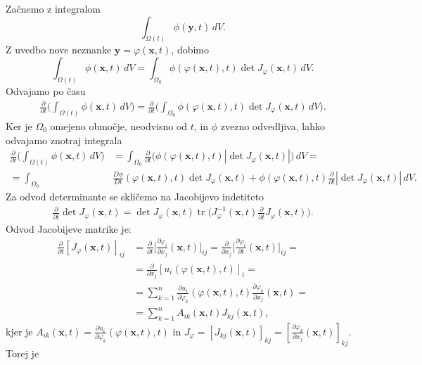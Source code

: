 \documentclass[mat2, tisk]{fmfdelo}
\newcommand{\bd}{\textbf}
\begin{document}
\begin{dokaz}
Začnemo z integralom 
$$
\int_{\Omega(t)} \phi(\mathbf{y},t)\, dV.
$$
Z uvedbo nove neznanke $\bd{y} = \varphi(\bd{x}, t)$, dobimo 
$$
\int_{\Omega(t)} \phi(\mathbf{x},t)\, dV = \int_{\Omega_0} \phi(\varphi({\mathbf{x}},t), t) \det{J_\varphi(\bd{x}, t)} \, dV.
$$
Odvajamo po času 
\begin{align*}
\frac{\partial}{\partial t} \Big(\int_{\Omega(t)} \phi(\mathbf{x},t)\, dV\Big) = \frac{\partial}{\partial t} \Big(\int_{\Omega_0} \phi(\varphi({\mathbf{x}},t), t) \det{J_\varphi(\bd{x}, t)} \, dV \Big).
\end{align*}
Ker je $\Omega_0$ omejeno območje, neodvisno od $t$, in $\phi$ zvezno odvedljiva, lahko odvajamo
znotraj integrala
\begin{align*}
\frac{\partial}{\partial t} \Big(\int_{\Omega(t)} \phi(\mathbf{x},t)\, dV\Big) &= \int_{\Omega_0} \frac{\partial}{\partial t} \Big(\phi(\varphi({\mathbf{x}},t), t) |\det{J_\varphi(\bd{x}, t)}|\Big) \, dV = \\
= \int_{\Omega_0} &\frac{D \phi}{D t}(\varphi(\bd{x}, t), t) \det J_\varphi(\bd{x}, t) + \phi(\varphi({\mathbf{x}},t), t) \frac{\partial}{\partial t} |\det{J_\varphi(\bd{x}, t)}| \, dV.
\end{align*}
Za odvod determinante se skličemo na Jacobijevo indetiteto 
\begin{align*}
\frac{\partial}{\partial t} \det{J_\varphi(\bd{x}, t)} = \det{J_\varphi(\bd{x}, t)} \operatorname{tr}\Big(J_\varphi^{-1}(\bd{x}, t) \frac{\partial}{\partial t} J_\varphi(\bd{x}, t)\Big).
\end{align*}
Odvod Jacobijeve matrike je:
\begin{align*}
\frac{\partial}{\partial t} [J_\varphi(\bd{x}, t)]_{ij} &= \frac{\partial}{\partial t} \Big[\frac{\partial \varphi_i}{\partial x_j}(\bd{x}, t)\Big]_{ij} = \frac{\partial}{\partial x_j} \Big[\frac{\partial \varphi_i}{\partial t}(\bd{x}, t)\Big]_{ij} = \\
&= \frac{\partial}{\partial x_j} [u_i(\varphi(\bd{x}, t), t)]_i = \\
&= \sum_{k=1}^n \frac{\partial u_i}{\partial \varphi_k}(\varphi(\bd{x}, t), t) \frac{\partial \varphi_k}{\partial x_j}(\bd{x}, t) = \\
&= \sum_{k=1}^n A_{ik}(\bd{x}, t) J_{kj}(\bd{x}, t),
\end{align*}
kjer je $A_{ik}(\bd{x}, t ) = \frac{\partial u_i}{\partial \varphi_k}(\varphi(\bd{x}, t), t)$ in $J_\varphi = [J_{kj}(\bd{x}, t)]_{kj} = \left[\frac{\partial \varphi_k}{\partial x_j}(\bd{x}, t)\right]_{kj}$. Torej je 

\end{dokaz}
\end{document}
